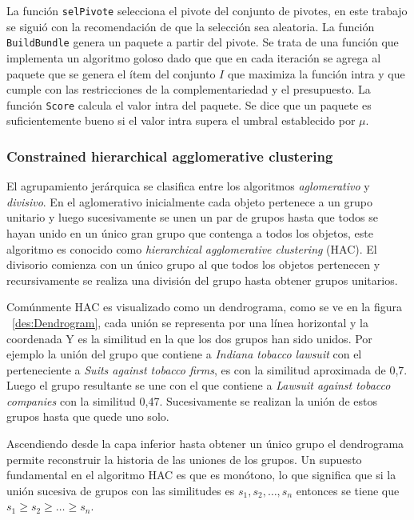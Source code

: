 La función \texttt{selPivote} selecciona el pivote del conjunto de pivotes, en este trabajo se siguió con la recomendación de \cite{newSimilarity} que la selección sea aleatoria. La función \texttt{BuildBundle} genera un paquete a partir del pivote. Se trata de una función que implementa un algoritmo goloso dado que que en cada iteración se agrega al paquete que se genera el ítem del conjunto $I$ que maximiza la función intra y que cumple con las restricciones de la complementariedad y el presupuesto. La función \texttt{Score} calcula el valor intra del paquete. Se dice que un paquete es suficientemente bueno si el valor intra supera el umbral establecido por $\mu$.


\subsubsection{Constrained hierarchical agglomerative clustering}
El agrupamiento jerárquica se clasifica entre los algoritmos \textit{aglomerativo} y \textit{divisivo}. En el aglomerativo inicialmente cada objeto pertenece a un grupo unitario y luego sucesivamente se unen un par de grupos hasta que todos se hayan unido en un único gran grupo que contenga a todos los objetos, este algoritmo es conocido como \textit{hierarchical agglomerative clustering} (HAC). El divisorio comienza con un único grupo al que todos los objetos pertenecen y recursivamente se realiza una división del grupo hasta obtener grupos unitarios.

Comúnmente HAC es visualizado como un dendrograma, como se ve en la figura ~\ref{des:Dendrogram}, cada unión se representa por una línea horizontal y la coordenada Y es la similitud en la que los dos grupos han sido unidos. Por ejemplo la unión del grupo que contiene a \textit{Indiana tobacco lawsuit} con el perteneciente a \textit{Suits against tobacco firms}, es con la similitud aproximada de 0,7. Luego el grupo resultante se une con el que contiene a \textit{Lawsuit against tobacco companies} con la similitud 0,47. Sucesivamente se realizan la unión de estos grupos hasta que quede uno solo.

Ascendiendo desde la capa inferior hasta obtener un único grupo el dendrograma permite reconstruir la historia de las uniones de los grupos. Un supuesto fundamental en el algoritmo HAC es que es monótono, lo que significa que si la unión sucesiva de grupos con las similitudes es $s_1,s_2,\ldots,s_n$ entonces se tiene que $s_1 \geq s_2 \geq \ldots \geq s_n$.

